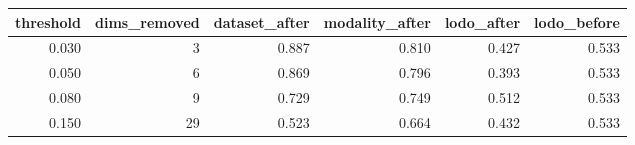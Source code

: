 \begin{tabular}{rrrrrr}
\toprule
threshold & dims\_removed & dataset\_after & modality\_after & lodo\_after & lodo\_before \\
\midrule
0.030 & 3 & 0.887 & 0.810 & 0.427 & 0.533 \\
0.050 & 6 & 0.869 & 0.796 & 0.393 & 0.533 \\
0.080 & 9 & 0.729 & 0.749 & 0.512 & 0.533 \\
0.150 & 29 & 0.523 & 0.664 & 0.432 & 0.533 \\
\bottomrule
\end{tabular}
